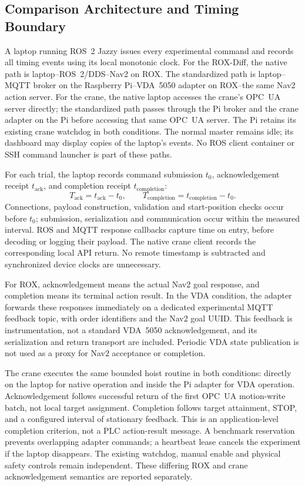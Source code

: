 \subsection{Comparison Architecture and Timing Boundary}
\label{subsec:laptop_timing}
A laptop running ROS~2 Jazzy issues every experimental command and records
all timing events using its local monotonic clock. For the ROX-Diff, the
native path is laptop--ROS~2/DDS--Nav2 on ROX. The standardized path is
laptop--MQTT broker on the Raspberry Pi--VDA~5050 adapter on ROX--the same
Nav2 action server. For the crane, the native laptop accesses the crane's
OPC~UA server directly; the standardized path passes through the Pi broker
and the crane adapter on the Pi before accessing that same OPC~UA server.
The Pi retains its existing crane watchdog in both conditions. The normal
master remains idle; its dashboard may display copies of the laptop's events.
No ROS client container or SSH command launcher is part of these paths.

For each trial, the laptop records command submission $t_0$, acknowledgement
receipt $t_{\mathrm{ack}}$, and completion receipt $t_{\mathrm{completion}}$:
\begin{equation}
T_{\mathrm{ack}}=t_{\mathrm{ack}}-t_0,\qquad
T_{\mathrm{completion}}=t_{\mathrm{completion}}-t_0.
\end{equation}
Connections, payload construction, validation and
start-position checks occur before $t_0$; submission, serialization and
communication occur within the measured interval. ROS and MQTT response
callbacks capture time on entry, before decoding or logging their payload.
The native crane client records the corresponding local API return. No
remote timestamp is subtracted and synchronized device clocks are unnecessary.

For ROX, acknowledgement means the actual Nav2 goal response, and completion
means its terminal action result. In the VDA condition, the adapter forwards
these responses immediately on a dedicated experimental MQTT feedback topic,
with order identifiers and the Nav2 goal UUID. This feedback is instrumentation,
not a standard VDA~5050 acknowledgement, and its serialization and return
transport are included. Periodic VDA state publication is not used as a proxy
for Nav2 acceptance or completion.

The crane executes the same bounded hoist routine in both conditions: directly
on the laptop for native operation and inside the Pi adapter for VDA operation.
Acknowledgement follows successful return of the first OPC~UA motion-write
batch, not local target assignment. Completion follows target attainment,
STOP, and a configured interval of stationary feedback. This is an
application-level completion criterion, not a PLC action-result message.
A benchmark reservation prevents overlapping adapter commands; a heartbeat
lease cancels the experiment if the laptop disappears. The existing watchdog,
manual enable and physical safety controls remain independent. These differing
ROX and crane acknowledgement semantics are reported separately.

